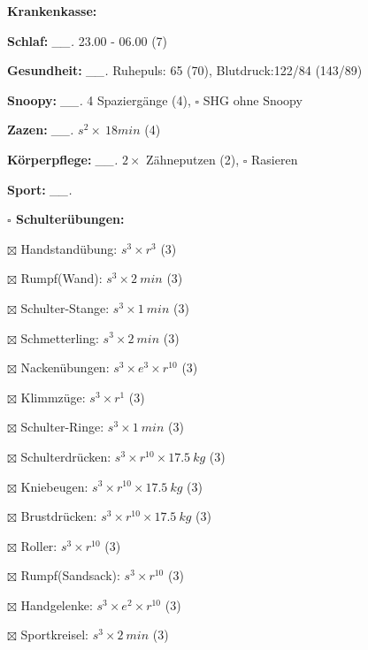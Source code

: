 \documentclass[10pt,a4paper]{article}
\newcommand\prop[1] {{\color {alizarin} {\bf #1}}}             %
\newcommand\mand[1] {{\color {burntorange} {\bf #1}}}          %
\newcommand\topspace{\vskip -15pt \hskip 20pt}
\newcommand\n[1] { {\sl #1.} \hskip 5pt }
\begin{document}
\begin{mdframed}[style=daystyle]
  \begin{labeling}{{\mand {Krankenkasse:}}}
    \setlength\itemsep{-3pt}
  \item[{\mand {Schlaf:}}]       \n{\_\_} 23.00 - 06.00 (7)
  \item[{\mand {Gesundheit:}}]   \n{\_\_} Ruhepuls: 65 (70), Blutdruck:122/84 (143/89)
  \item[{\mand {Snoopy:}}]       \n{\_\_} 4 Spaziergänge (4), $\square$ SHG ohne Snoopy 
  \item[{\mand {Zazen:}}]        \n{\_\_} $s^2 \times\ 18 min$ (4)
  \item[{\mand {Körperpflege:}}] \n{\_\_} $2 \times$ Zähneputzen (2), $\square$ Rasieren
  \item[{\mand {Sport:}}]        \n{\_\_}
    \topspace
    \begin{minipage}{0.75\textwidth}  
      \begin{labeling}{\prop {$\square$ {Schulterübungen:}}} 
        \setlength\itemsep{-3pt}
      \item[$\boxtimes$ Handstandübung:]  $s^3 \times r^{3}$ (3)
      \item[$\boxtimes$ Rumpf(Wand):]     $s^3 \times 2\ min$ (3)
      \item[$\boxtimes$ Schulter-Stange:] $s^3 \times 1\ min$ (3)
      \item[$\boxtimes$ Schmetterling:]   $s^3 \times 2\ min$ (3)
      \item[$\boxtimes$ Nackenübungen:]   $s^3 \times e^3 \times r^{10}$ (3)
      \item[$\boxtimes$ Klimmzüge:]       $s^3 \times r^1$ (3)
      \item[$\boxtimes$ Schulter-Ringe:]  $s^3 \times 1\ min$ (3)
      \item[$\boxtimes$ Schulterdrücken:] $s^3 \times r^{10} \times 17.5\ kg$ (3)
      \item[$\boxtimes$ Kniebeugen:]      $s^3 \times r^{10} \times 17.5\ kg$ (3)
      \item[$\boxtimes$ Brustdrücken:]    $s^3 \times r^{10} \times 17.5\ kg$ (3)
      \item[$\boxtimes$ Roller:]          $s^3 \times r^{10}$ (3)
      \item[$\boxtimes$ Rumpf(Sandsack):] $s^3 \times r^{10}$ (3)
      \item[$\boxtimes$ Handgelenke:]     $s^3 \times e^2 \times r^{10}$ (3)
      \item[$\boxtimes$ Sportkreisel:]    $s^3 \times 2\ min$ (3)

\end{labeling}
\end{minipage}
\end{labeling}
\end{mdframed}
\end{document}
